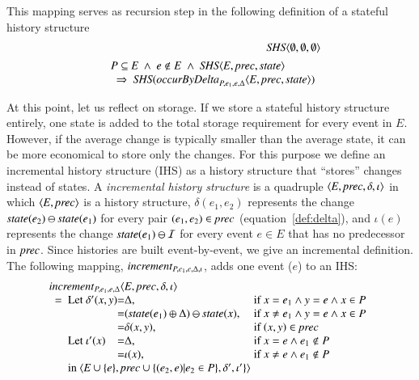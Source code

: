 \documentclass{elsarticle}
\def\id#1{\text{\em #1\/}}
\def\Events{{\mathit E}}
\begin{document}
	This mapping serves as recursion step in the following definition of a stateful history structure
\begin{eqnarray}
	&&\id{SHS}\la \emptyset, \emptyset, \emptyset\ra\\
&&\begin{array}{@{}l}
	P\subseteq\Events\ \wedge\ e\notin E\ \wedge\ \id{SHS}\la \Events, \id{prec}, \id{state}\ra\\
	\ \ \Rightarrow\ \id{SHS}(\id{occurByDelta}_{P,e_1,e,\Delta}\la \Events, \id{prec}, \id{state}\ra)
\end{array}
\label{req:recursive def SHS by Delta}
\end{eqnarray}

	At this point, let us reflect on storage.
	If we store a stateful history structure entirely,
	one state is added to the total storage requirement for every event in $\Events$.
	However, if the average change is typically smaller than the average state, it can be more economical to store only the changes.
	For this purpose we define an incremental history structure (IHS)
	as a history structure that ``stores'' changes instead of states.
	A {\em incremental history structure} is a quadruple $\la\Events, \id{prec}, \delta, \iota\ra$ in which
	$\la \Events, \id{prec}\ra$ is a history structure,
	$\delta(e_1,e_2)$ represents the change $\id{state}(e_2)\ominus\id{state}(e_1)$ for every pair $(e_1,e_2)\in\id{prec}$ (equation~\ref{def:delta}),
	and $\iota(e)$ represents the change $\id{state}(e_1)\ominus\mathcal I$ for every event $e\in\Events$ that has no predecessor in $\id{prec}$.
	Since histories are built event-by-event, we give an incremental definition.
	The following mapping, $\id{increment}_{P,e_1,e,\Delta,\iota}$,
	adds one event ($e$) to an IHS:
\begin{eqnarray}
\begin{array}{l}
	\id{increment}_{P,e_1,e,\Delta}\la\Events, \id{prec}, \delta, \iota\ra\\
	\ \ =\ \begin{array}[t]{@{}l@{}c@{}ll}
		\text{Let }\delta'(x,y)&=&\Delta\text{, }&\text{if }x=e_1\wedge y=e\wedge x\in P\\
				       &=&(\id{state}(e_1)\oplus\Delta)\ominus\id{state}(x)\text{, }&\text{if }x\neq e_1\wedge y=e\wedge x\in P\\
				       &=&\delta(x,y)\text{, }&\text{if }(x,y)\in\id{prec}\\
		\text{Let }\iota'(x)&=&\Delta\text{, }&\text{if }x=e\wedge e_1\notin P\\
				    &=&\iota(x)\text{, }&\text{if }x\neq e\wedge e_1\notin P\\
			\multicolumn{4}{@{}l}{\text{in }\la\Events\cup\{e\}, \id{prec}\cup\{(e_2,e)|e_2\in P\}, \delta', \iota'\}\ra}
		\end{array}
\end{array}
\label{req:increment}
\end{eqnarray}
\end{document}
